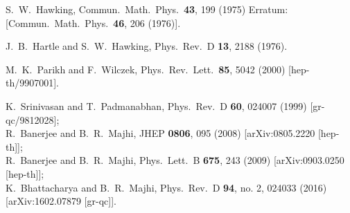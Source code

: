 \documentclass[preprintnumbers,10pt,nofootinbib]{revtex4}
\begin{document}
\begin{thebibliography}{200}

  S.~W.~Hawking,
  Commun.\ Math.\ Phys.\  {\bf 43}, 199 (1975)
  Erratum: [Commun.\ Math.\ Phys.\  {\bf 46}, 206 (1976)].

  J.~B.~Hartle and S.~W.~Hawking,
  Phys.\ Rev.\ D {\bf 13}, 2188 (1976).

  M.~K.~Parikh and F.~Wilczek,
  Phys.\ Rev.\ Lett.\  {\bf 85}, 5042 (2000)
  [hep-th/9907001].

  K.~Srinivasan and T.~Padmanabhan,
  Phys.\ Rev.\ D {\bf 60}, 024007 (1999)
  [gr-qc/9812028];\\
  R.~Banerjee and B.~R.~Majhi,
  JHEP {\bf 0806}, 095 (2008)
  [arXiv:0805.2220 [hep-th]];\\
  R.~Banerjee and B.~R.~Majhi,
  Phys.\ Lett.\ B {\bf 675}, 243 (2009)
  [arXiv:0903.0250 [hep-th]];\\
  K.~Bhattacharya and B.~R.~Majhi,
  Phys.\ Rev.\ D {\bf 94}, no. 2, 024033 (2016)
  [arXiv:1602.07879 [gr-qc]].



\end{thebibliography}
\end{document}

